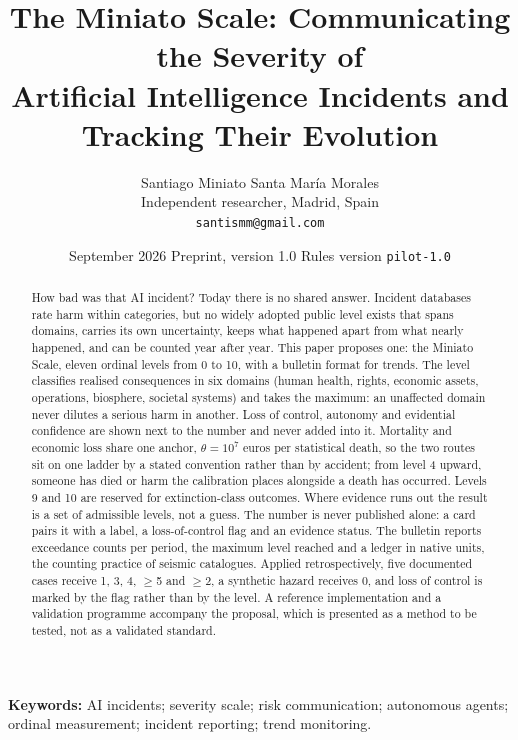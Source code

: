 \documentclass[11pt,a4paper]{article}
\title{\textbf{The Miniato Scale: Communicating the Severity of\\ Artificial Intelligence Incidents and Tracking Their Evolution}}
\author{Santiago Miniato Santa Mar\'ia Morales\\
\small Independent researcher, Madrid, Spain\\
\small \texttt{santismm@gmail.com}}
\date{September 2026 \quad\textperiodcentered\quad Preprint, version 1.0 \quad\textperiodcentered\quad Rules version \texttt{pilot-1.0}}
\begin{document}
\maketitle

\begin{abstract}
\noindent
How bad was that AI incident? Today there is no shared answer. Incident databases rate harm within categories, but no widely adopted public level exists that spans domains, carries its own uncertainty, keeps what happened apart from what nearly happened, and can be counted year after year. This paper proposes one: the Miniato Scale, eleven ordinal levels from 0 to 10, with a bulletin format for trends. The level classifies realised consequences in six domains (human health, rights, economic assets, operations, biosphere, societal systems) and takes the maximum: an unaffected domain never dilutes a serious harm in another. Loss of control, autonomy and evidential confidence are shown next to the number and never added into it. Mortality and economic loss share one anchor, $\theta = 10^{7}$ euros per statistical death, so the two routes sit on one ladder by a stated convention rather than by accident; from level 4 upward, someone has died or harm the calibration places alongside a death has occurred. Levels 9 and 10 are reserved for extinction-class outcomes. Where evidence runs out the result is a set of admissible levels, not a guess. The number is never published alone: a card pairs it with a label, a loss-of-control flag and an evidence status. The bulletin reports exceedance counts per period, the maximum level reached and a ledger in native units, the counting practice of seismic catalogues. Applied retrospectively, five documented cases receive 1, 3, 4, $\ge$5 and $\ge$2, a synthetic hazard receives 0, and loss of control is marked by the flag rather than by the level. A reference implementation and a validation programme accompany the proposal, which is presented as a method to be tested, not as a validated standard.
\end{abstract}

\noindent\textbf{Keywords:} AI incidents; severity scale; risk communication; autonomous agents; ordinal measurement; incident reporting; trend monitoring.
\end{document}
